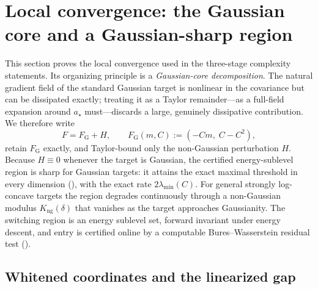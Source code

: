 \section{Local convergence: the Gaussian core and a Gaussian-sharp region}
\label{sec:local}

This section proves the local convergence used in the three-stage complexity statements.
Its organizing principle is a \emph{Gaussian-core decomposition}. The natural gradient
field of the standard Gaussian target is nonlinear in the covariance but can be dissipated
exactly; treating it as a Taylor remainder---as a full-field expansion around $a_\star$
must---discards a large, genuinely dissipative contribution. We therefore write
\[
    F=F_{\mathrm G}+H,
    \qquad
    F_{\mathrm G}(m,C):=(-Cm,\;C-C^2),
\]
retain $F_{\mathrm G}$ exactly, and Taylor-bound only the non-Gaussian perturbation $H$.
Because $H\equiv0$ whenever the target is Gaussian, the certified energy-sublevel region is
sharp for Gaussian targets: it attains the exact maximal threshold in every dimension
(), with the exact rate $2\lambda_{\min}(C)$. For general
strongly log-concave targets the region degrades continuously through a non-Gaussian
modulus $K_{\mathrm{ng}}(\delta)$ that vanishes as the target approaches Gaussianity. The
switching region is an energy sublevel set, forward invariant under energy descent, and
entry is certified online by a computable Bures--Wasserstein residual test
().

\subsection{Whitened coordinates and the linearized gap}
\label{subsec:whitened}

